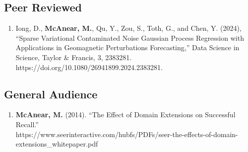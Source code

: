 \documentclass[11pt, letterpaper]{article}
\begin{document}
\subsection{Peer Reviewed}
\begin{enumerate}
    \item Iong, D., \textbf{McAnear, M.}, Qu, Y., Zou, S., Toth, G., and Chen, Y. (2024), ``Sparse Variational Contaminated Noise Gaussian Process Regression with Applications in Geomagnetic Perturbations Forecasting,'' Data Science in Science, Taylor \& Francis, 3, 2383281. \\https://doi.org/10.1080/26941899.2024.2383281.
\end{enumerate}

\subsection{General Audience}
\begin{enumerate}
    \item \textbf{McAnear, M.} (2014). ``The Effect of Domain Extensions on Successful Recall.'' \\https://www.seerinteractive.com/hubfs/PDFs/seer-the-effects-of-domain-extensions\_whitepaper.pdf
\end{enumerate}
\end{document}
